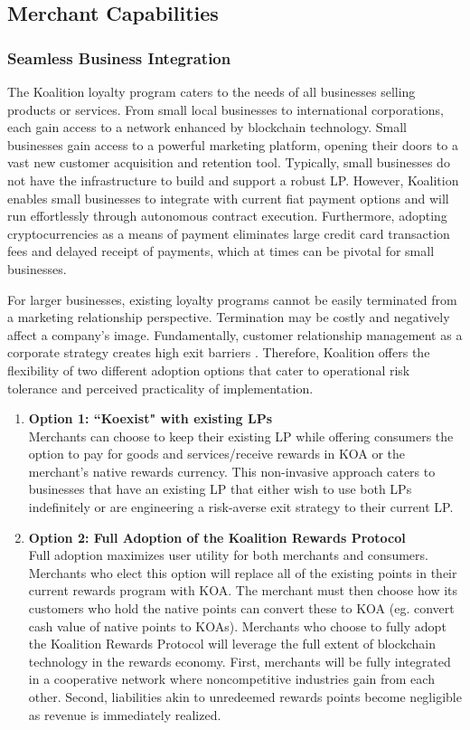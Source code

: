 \subsection{Merchant Capabilities}

\subsubsection{Seamless Business Integration}
The Koalition loyalty program caters to the needs of all businesses selling products or services. From small local businesses to international corporations, each gain access to a network enhanced by blockchain technology. Small businesses gain access to a powerful marketing platform, opening their doors to a vast new customer acquisition and retention tool. Typically, small businesses do not have the infrastructure to build and support a robust LP. However, Koalition enables small businesses to integrate with current fiat payment options and will run effortlessly through autonomous contract execution. Furthermore, adopting cryptocurrencies as a means of payment eliminates large credit card transaction fees and delayed receipt of payments, which at times can be pivotal for small businesses.

For larger businesses, existing loyalty programs cannot be easily terminated from a marketing relationship perspective. Termination may be costly and negatively affect a company's image. Fundamentally, customer relationship management as a corporate strategy creates high exit barriers \cite{Rehnen16}. Therefore, Koalition offers the flexibility of two different adoption options that cater to operational risk tolerance and perceived practicality of implementation.  


\begin{enumerate}
\item \textbf{Option 1: ``Koexist" with existing LPs} \\
Merchants can choose to keep their existing LP while offering consumers the option to pay for goods and services/receive rewards in KOA or the merchant's native rewards currency. This non-invasive approach caters to businesses that have an existing LP that either wish to use both LPs indefinitely or are engineering a risk-averse exit strategy to their current LP.

\item \textbf{Option 2: Full Adoption of the Koalition Rewards Protocol} \\
Full adoption maximizes user utility for both merchants and consumers. Merchants who elect this option will replace all of the existing points in their current rewards program with KOA. The merchant must then choose how its customers who hold the native points can convert these to KOA (eg. convert cash value of native points to KOAs). Merchants who choose to fully adopt the Koalition Rewards Protocol will leverage the full extent of blockchain technology in the rewards economy. First, merchants will be fully integrated in a cooperative network where noncompetitive industries gain from each other. Second, liabilities akin to unredeemed rewards points become negligible as revenue is immediately realized.
\end{enumerate}

